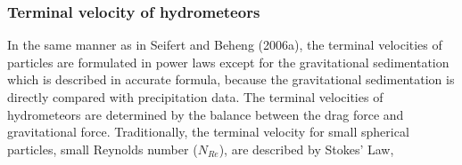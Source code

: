 \begin{table}[h]
\begin{center}
\caption{Constant parameters chosen for the generalized gamma distribution; power law coefficients used for maximum dimensions and the projected area; and ranges of lower- and upper limits of mean mass.}
\label{table_sn14-1}
\end{center}
\end{table}

\subsubsection{Terminal velocity of hydrometeors}
In the same manner as in Seifert and Beheng (2006a), the terminal velocities of particles are formulated in power laws except for the gravitational sedimentation which is described in accurate formula, because the gravitational sedimentation is directly compared with precipitation data. The terminal velocities of hydrometeors are determined by the balance between the drag force and gravitational force. Traditionally, the terminal velocity for small spherical particles, small Reynolds number ($N_{Re}$), are described by Stokes’ Law,

